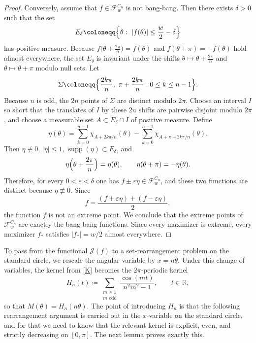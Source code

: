 \documentclass[11pt,letterpaper,reqno]{amsart}
\begin{document}
\begin{proof}
Conversely, assume that $f\in\mathcal F_w^{C_n}$ is not bang-bang. Then there exists $\delta>0$ such that the set
\[
E_\delta\coloneqq\Bigl\{\theta:\ |f(\theta)|\le \frac w2-\delta\Bigr\}
\]
has positive measure. Because $f\bigl(\theta+\frac{2\pi}{n}\bigr)=f(\theta)$ and $f(\theta+\pi)=-f(\theta)$ hold almost everywhere, the set $E_\delta$ is invariant under the shifts $\theta\mapsto\theta+\frac{2\pi}{n}$ and $\theta\mapsto\theta+\pi$ modulo null sets. Let
\[
\Sigma\coloneqq\Bigl\{\frac{2k\pi}{n},\ \pi+\frac{2k\pi}{n}:0\le k\le n-1\Bigr\}.
\]
 Because $n$ is odd, the $2n$ points of $\Sigma$ are distinct modulo $2\pi$. Choose an interval $I$ so short that the translates of $I$ by these $2n$ shifts are pairwise disjoint modulo $2\pi$, and choose a measurable set $A\subset  E_\delta\cap I$ of positive measure. Define
\[
\eta(\theta)
=
\sum_{k=0}^{n-1}\chi_{A+2k\pi/n}(\theta)
-
\sum_{k=0}^{n-1}\chi_{A+\pi+2k\pi/n}(\theta).
\]
Then $\eta\not\equiv0$, $|\eta|\le1$, $\operatorname{supp}(\eta)\subset E_\delta$, and
\[
\eta\Bigl(\theta+\frac{2\pi}{n}\Bigr)=\eta(\theta),
\qquad
\eta(\theta+\pi)=-\eta(\theta).
\]
Therefore, for every $0<\varepsilon<\delta$ one has $f\pm\varepsilon\eta\in\mathcal F_w^{C_n}$, and these two functions are distinct because $\eta\not\equiv0$. Since
\[
f=\frac{(f+\varepsilon\eta)+(f-\varepsilon\eta)}{2},
\]
the function $f$ is not an extreme point. We conclude that the extreme points of $\mathcal F_w^{C_n}$ are exactly the bang-bang functions. Since every maximizer is extreme, every maximizer $f_*$ satisfies $|f_*|=w/2$ almost everywhere.
\end{proof}

To pass from the functional $\mathcal J(f)$ to a set-rearrangement problem on the standard circle, we rescale the angular variable by $x=n\theta$. Under this change of variables, the kernel from  \eqref{K}
becomes the $2\pi$-periodic kernel
\begin{equation}
\label{HnKernel}
H_n(t)\coloneqq \sum_{\substack{m\ge1\\m\text{ odd}}}\frac{\cos(mt)}{n^2m^2-1},
\qquad t\in\mathbb R,
\end{equation}
so that $M(\theta)=H_n(n\theta)$. The point of introducing $H_n$ is that the following rearrangement argument is carried out in the $x$-variable on the standard circle, and for that we need to know that the relevant kernel is explicit, even, and strictly decreasing on $[0,\pi]$. The next lemma proves exactly this.
\end{document}
